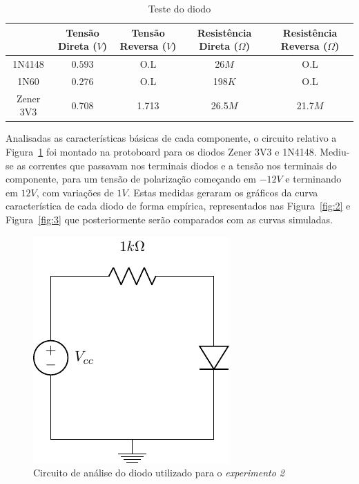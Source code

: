 \documentclass[12pt,a4paper]{article}
\begin{document}
\begin{table}[htpb]
  \centering
  \caption{Teste do diodo}
  \label{tab:1}
  \begin{adjustbox}{max width=\textwidth}
  \begin{tabular}{c c c c c}
    \toprule
    & Tensão Direta ($V$) & Tensão Reversa ($V$) &Resistência Direta ($\Omega$)& Resistência Reversa ($\Omega$)\\ \midrule
    1N4148  &$0.593$ &O.L&26$M$ &O.L  \\
    1N60&0.276 &O.L &198$K$&O.L  \\
    Zener 3V3&0.708 &1.713 &26.5$M$ &21.7$M$\\\bottomrule
  \end{tabular}
\end{adjustbox}
\end{table}
Analisadas as características básicas de cada componente, o circuito relativo a Figura~\ref{fig:1} foi montado na protoboard para os diodos Zener 3V3 e 1N4148. Mediu-se as correntes que passavam nos terminais diodos e a tensão nos terminais do componente, para um tensão de polarização começando em $-12V$ e terminando em  $12 V$, com variações de $1V$. Estas medidas geraram os gráficos da curva característica de cada diodo de forma empírica, representados nas Figura~\ref{fig:2} e Figura~\ref{fig:3} que posteriormente serão comparados com as curvas simuladas.
\begin{figure}[htpb]
  \centering
  \includegraphics{protoboard.pdf}
  \caption{Circuito de análise do diodo utilizado para o \emph{experimento 2}}
  \label{fig:1}
\end{figure}
\end{document}
